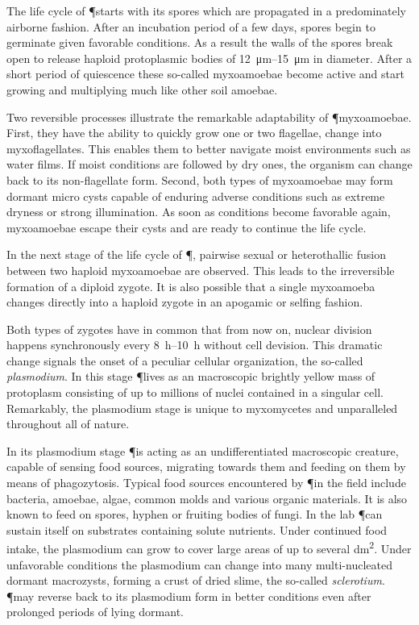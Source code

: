 		The life cycle of \P starts with its spores which are propagated in a predominately airborne fashion. After an incubation period of a few days, spores begin to germinate given favorable conditions. As a result the walls of the spores break open to release haploid protoplasmic bodies of \SIrange{12}{15}{\micro\metre} in diameter. After a short period of quiescence these so-called myxoamoebae become active and start growing and multiplying much like other soil amoebae. 

		Two reversible processes illustrate the remarkable adaptability of \P myxoamoebae. First, they have the ability to quickly grow one or two flagellae, \ie change into myxoflagellates. This enables them to better navigate moist environments such as water films. If moist conditions are followed by dry ones, the organism can change back to its non-flagellate form. Second, both types of myxoamoebae may form dormant micro cysts capable of enduring adverse conditions such as extreme dryness or strong illumination. As soon as conditions become favorable again, myxoamoebae escape their cysts and are ready to continue the life cycle.

		In the next stage of the life cycle of \P, pairwise sexual or heterothallic fusion between two haploid myxoamoebae are observed. This leads to the irreversible formation of a diploid zygote. It is also possible that a single myxoamoeba changes directly into a haploid zygote in an apogamic or selfing fashion.

		Both types of zygotes have in common that from now on, nuclear division happens synchronously every \SIrange{8}{10}{\hour} without cell devision. This dramatic change signals the onset of a peculiar cellular organization, the so-called \emph{plasmodium}. In this stage \P lives as an macroscopic brightly yellow mass of protoplasm consisting of up to millions of nuclei contained in a singular cell. Remarkably, the plasmodium stage is unique to myxomycetes and unparalleled throughout all of nature.

		In its plasmodium stage \P is acting as an undifferentiated macroscopic creature, capable of sensing food sources, migrating towards them and feeding on them by means of phagozytosis. Typical food sources encountered by \P in the field include bacteria, amoebae, algae, common molds and various organic materials. It is also known to feed on spores, hyphen or fruiting bodies of fungi. In the lab \P can sustain itself on substrates containing solute nutrients. Under continued food intake, the plasmodium can grow to cover large areas of up to  several \si{\deci\metre\squared}. Under unfavorable conditions the plasmodium can change into many multi-nucleated dormant macrozysts, forming a crust of dried slime, the so-called \emph{sclerotium}. \P may reverse back to its plasmodium form in better conditions even after prolonged periods of lying dormant. 


